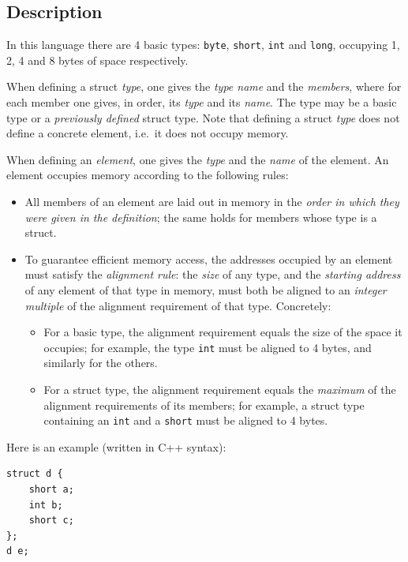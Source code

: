 \documentclass[11pt]{article}
\begin{document}
\subsection*{Description}

In this language there are 4 basic types: \texttt{byte}, \texttt{short},
\texttt{int} and \texttt{long}, occupying 1, 2, 4 and 8 bytes of space
respectively.

When defining a struct \emph{type}, one gives the \emph{type name} and
the \emph{members}, where for each member one gives, in order, its
\emph{type} and its \emph{name}.
The type may be a basic type or a \emph{previously defined} struct type.
Note that defining a struct \emph{type} does not define a concrete
element, i.e.\ it does not occupy memory.

When defining an \emph{element}, one gives the \emph{type} and the
\emph{name} of the element.
An element occupies memory according to the following rules:
\begin{itemize}
\item All members of an element are laid out in memory in the
  \emph{order in which they were given in the definition}; the same
  holds for members whose type is a struct.
\item To guarantee efficient memory access, the addresses occupied by an
  element must satisfy the \emph{alignment rule}: the \emph{size} of
  any type, and the \emph{starting address} of any element of that type
  in memory, must both be aligned to an \emph{integer multiple} of the
  alignment requirement of that type.
  Concretely:
  \begin{itemize}
  \item For a basic type, the alignment requirement equals the size of
    the space it occupies; for example, the type \texttt{int} must be
    aligned to 4 bytes, and similarly for the others.
  \item For a struct type, the alignment requirement equals the
    \emph{maximum} of the alignment requirements of its members; for
    example, a struct type containing an \texttt{int} and a
    \texttt{short} must be aligned to 4 bytes.
  \end{itemize}
\end{itemize}

Here is an example (written in C++ syntax):
\begin{verbatim}
struct d {
    short a;
    int b;
    short c;
};
d e;
\end{verbatim}
\end{document}
